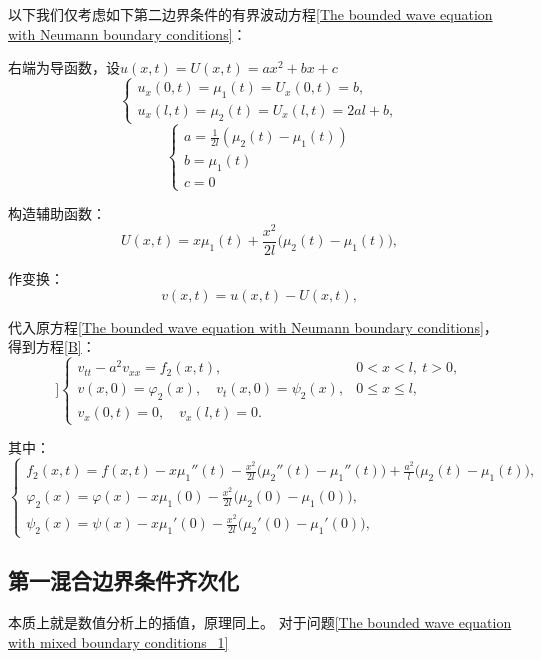 \documentclass[12pt,a4paper]{article}
\numberwithin{subsection}{section}   %
\numberwithin{subsubsection}{subsection}
\theoremstyle{plain}
\theoremstyle{definition}
\theoremstyle{remark}
\theoremstyle{remark}
\begin{document}
		
		以下我们仅考虑如下第二边界条件的有界波动方程\eqref{The bounded wave equation with Neumann boundary conditions}：
		
		右端为导函数，设$u(x, t)=U(x, t)=ax^2+bx+c$
		\[
		\begin{cases}
			u_x(0, t) = \mu_1(t) = U_x(0, t) = b, \\
			u_x(l, t) = \mu_2(t) = U_x(l, t) = 2al + b,
		\end{cases}
		\]
		\[
		\begin{cases}
			a = \frac{1}{2l}(\mu_2(t) - \mu_1(t)) \\
			b = \mu_1(t) \\
			c = 0 
		\end{cases}
		\]
		
		构造辅助函数：
		\begin{equation}
			U(x, t) = x\mu_1(t) + \frac{x^2}{2l}\big( \mu_2(t) - \mu_1(t) \big),
		\end{equation}
		
		作变换：
		\begin{equation}
			v(x, t) = u(x, t) - U(x, t),
		\end{equation}
		
		代入原方程\eqref{The bounded wave equation with Neumann boundary conditions}，
		得到方程\eqref{B}：
	    \begin{equation}]\label{B}
		\begin{cases}
			v_{tt} - a^2 v_{xx} = f_2(x, t), & 0 < x < l, \ t > 0, \\
			v(x, 0) = \varphi_2(x), \quad v_t(x, 0) = \psi_2(x), & 0 \leq x \leq l, \\
			v_x(0, t) = 0, \quad v_x(l, t) = 0. &
		\end{cases}
	\end{equation}

其中：
		\begin{equation}
			\begin{cases}
				f_2(x, t) = f(x, t)-x\mu_1''(t) - \frac{x^2}{2l}\big( \mu_2''(t) - \mu_1''(t) \big) + \frac{a^2}{l}\big( \mu_2(t) - \mu_1(t) \big), \\
				\varphi_2(x) = \varphi(x) - x\mu_1(0) - \frac{x^2}{2l}\big( \mu_2(0) - \mu_1(0) \big), \\
			\psi_2(x) = \psi(x) - x\mu_1'(0) - \frac{x^2}{2l}\big( \mu_2'(0) - \mu_1'(0) \big), 
			\end{cases}
		\end{equation}
		
	
		
	\subsection{第一混合边界条件齐次化}
	本质上就是数值分析上的插值，原理同上。
	对于问题\eqref{The bounded wave equation with mixed boundary conditions_1}
	
\end{document}

